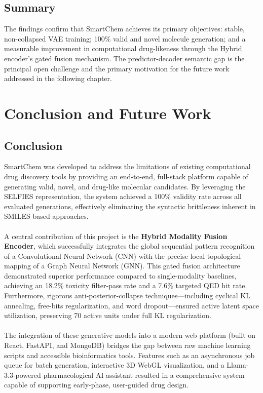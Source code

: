 \documentclass[12pt,a4paper]{report}
\begin{document}
\section{Summary}

The findings confirm that SmartChem achieves its primary objectives: stable, non-collapsed VAE training; 100\% valid and novel molecule generation; and a measurable improvement in computational drug-likeness through the Hybrid encoder's gated fusion mechanism. The predictor-decoder semantic gap is the principal open challenge and the primary motivation for the future work addressed in the following chapter.



\chapter{Conclusion and Future Work}

\section{Conclusion}

SmartChem was developed to address the limitations of existing computational drug discovery tools by providing an end-to-end, full-stack platform capable of generating valid, novel, and drug-like molecular candidates. By leveraging the SELFIES representation, the system achieved a 100\% validity rate across all evaluated generations, effectively eliminating the syntactic brittleness inherent in SMILES-based approaches. 
\\ \\
A central contribution of this project is the \textbf{Hybrid Modality Fusion Encoder}, which successfully integrates the global sequential pattern recognition of a Convolutional Neural Network (CNN) with the precise local topological mapping of a Graph Neural Network (GNN). This gated fusion architecture demonstrated superior performance compared to single-modality baselines, achieving an 18.2\% toxicity filter-pass rate and a 7.6\% targeted QED hit rate. Furthermore, rigorous anti-posterior-collapse techniques—including cyclical KL annealing, free-bits regularization, and word dropout—ensured active latent space utilization, preserving 70 active units under full KL regularization.
\\ \\
The integration of these generative models into a modern web platform (built on React, FastAPI, and MongoDB) bridges the gap between raw machine learning scripts and accessible bioinformatics tools. Features such as an asynchronous job queue for batch generation, interactive 3D WebGL visualization, and a Llama-3.3-powered pharmacological AI assistant resulted in a comprehensive system capable of supporting early-phase, user-guided drug design.
\end{document}
